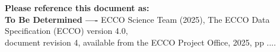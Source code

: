 \textbf{Please reference this document as:}\\
  \textbf{To Be Determined ----} ECCO Science Team (2025), The ECCO Data Specification (ECCO) version 4.0,\\
  document revision 4, available from the ECCO Project Office, 2025, pp ....

\newpage
\mbox{}